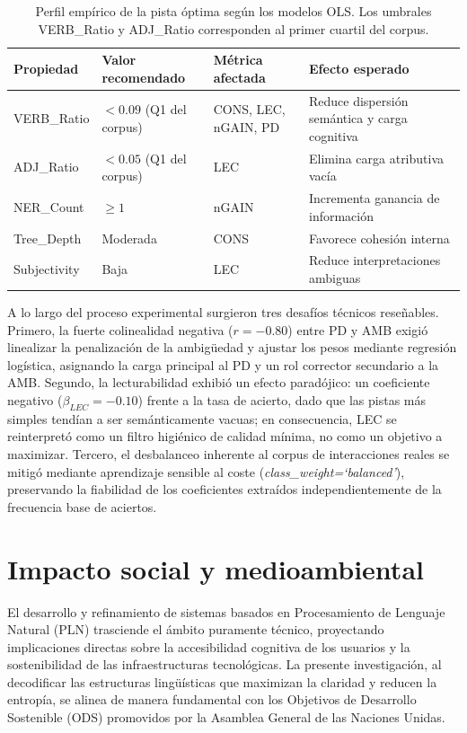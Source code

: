 \documentclass[../main.tex]{subfiles}
\begin{document}
\begin{table}[H]
\centering
\begin{tabular}{p{2.8cm}p{3cm}p{2.8cm}p{4.5cm}}
\hline
\textbf{Propiedad} & \textbf{Valor recomendado} & \textbf{Métrica afectada} & \textbf{Efecto esperado} \\
\hline
VERB\_Ratio & $< 0.09$ (Q1 del corpus) & CONS, LEC, nGAIN, PD & Reduce dispersión semántica y carga cognitiva \\
ADJ\_Ratio & $< 0.05$ (Q1 del corpus) & LEC & Elimina carga atributiva vacía \\
NER\_Count & $\geq 1$ & nGAIN & Incrementa ganancia de información \\
Tree\_Depth & Moderada & CONS & Favorece cohesión interna \\
Subjectivity & Baja & LEC & Reduce interpretaciones ambiguas \\
\hline
\end{tabular}
\caption{Perfil empírico de la pista óptima según los modelos OLS. Los umbrales VERB\_Ratio y ADJ\_Ratio corresponden al primer cuartil del corpus.}
\label{tab:perfil_optimo}
\end{table}

A lo largo del proceso experimental surgieron tres desafíos técnicos reseñables. Primero, la fuerte colinealidad negativa ($r = -0.80$) entre PD y AMB exigió linealizar la penalización de la ambigüedad y ajustar los pesos mediante regresión logística, asignando la carga principal al PD y un rol corrector secundario a la AMB. Segundo, la lecturabilidad exhibió un efecto paradójico: un coeficiente negativo ($\beta_{LEC} = -0.10$) frente a la tasa de acierto, dado que las pistas más simples tendían a ser semánticamente vacuas; en consecuencia, LEC se reinterpretó como un filtro higiénico de calidad mínima, no como un objetivo a maximizar. Tercero, el desbalanceo inherente al corpus de interacciones reales se mitigó mediante aprendizaje sensible al coste (\textit{class\_weight=`balanced'}), preservando la fiabilidad de los coeficientes extraídos independientemente de la frecuencia base de aciertos.

\section{Impacto social y medioambiental}

El desarrollo y refinamiento de sistemas basados en Procesamiento de Lenguaje Natural (PLN) trasciende el ámbito puramente técnico, proyectando implicaciones directas sobre la accesibilidad cognitiva de los usuarios y la sostenibilidad de las infraestructuras tecnológicas. La presente investigación, al decodificar las estructuras lingüísticas que maximizan la claridad y reducen la entropía, se alinea de manera fundamental con los Objetivos de Desarrollo Sostenible (ODS) promovidos por la Asamblea General de las Naciones Unidas.
\end{document}
